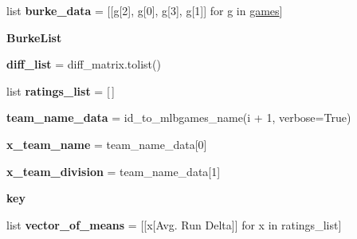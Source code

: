 \begin{DoxyCompactItemize}
\item 
list {\bfseries burke\+\_\+data} = \mbox{[}\mbox{[}g\mbox{[}2\mbox{]}, g\mbox{[}0\mbox{]}, g\mbox{[}3\mbox{]}, g\mbox{[}1\mbox{]}\mbox{]} for g in \hyperlink{namespacefull__ratings__calculations_ad7fbe206580dbeabe107c6ac5b3fe020}{games}\mbox{]}\hypertarget{namespacefull__ratings__calculations_a91ffb2063b7d59461eb7e62c00f51ea4}{}\label{namespacefull__ratings__calculations_a91ffb2063b7d59461eb7e62c00f51ea4}

\item 
{\bfseries Burke\+List}
\item 
{\bfseries diff\+\_\+list} = diff\+\_\+matrix.\+tolist()\hypertarget{namespacefull__ratings__calculations_a53c30fef438d9843924f6cc6d66ad79f}{}\label{namespacefull__ratings__calculations_a53c30fef438d9843924f6cc6d66ad79f}

\item 
list {\bfseries ratings\+\_\+list} = \mbox{[}$\,$\mbox{]}\hypertarget{namespacefull__ratings__calculations_a6151dea69e4d1a260c498ffd2f07e4d7}{}\label{namespacefull__ratings__calculations_a6151dea69e4d1a260c498ffd2f07e4d7}

\item 
{\bfseries team\+\_\+name\+\_\+data} = id\+\_\+to\+\_\+mlbgames\+\_\+name(i + 1, verbose=True)\hypertarget{namespacefull__ratings__calculations_a09be28a069e7e9a77064b0b56acadc80}{}\label{namespacefull__ratings__calculations_a09be28a069e7e9a77064b0b56acadc80}

\item 
{\bfseries x\+\_\+team\+\_\+name} = team\+\_\+name\+\_\+data\mbox{[}0\mbox{]}\hypertarget{namespacefull__ratings__calculations_a967f4f2df3d3fe2486f33acedaa7c7f1}{}\label{namespacefull__ratings__calculations_a967f4f2df3d3fe2486f33acedaa7c7f1}

\item 
{\bfseries x\+\_\+team\+\_\+division} = team\+\_\+name\+\_\+data\mbox{[}1\mbox{]}\hypertarget{namespacefull__ratings__calculations_a0e8f3f84eb55ece9679b422c8113f90e}{}\label{namespacefull__ratings__calculations_a0e8f3f84eb55ece9679b422c8113f90e}

\item 
{\bfseries key}\hypertarget{namespacefull__ratings__calculations_af388e6bff85ea3ffe17d9506e160f64f}{}\label{namespacefull__ratings__calculations_af388e6bff85ea3ffe17d9506e160f64f}

\item 
list {\bfseries vector\+\_\+of\+\_\+means} = \mbox{[}\mbox{[}x\mbox{[}\textquotesingle{}Avg. Run Delta\textquotesingle{}\mbox{]}\mbox{]} for x in ratings\+\_\+list\mbox{]}\hypertarget{namespacefull__ratings__calculations_a0556c829610c539b7023ab48e509bd12}{}\label{namespacefull__ratings__calculations_a0556c829610c539b7023ab48e509bd12}


\end{DoxyCompactItemize}

